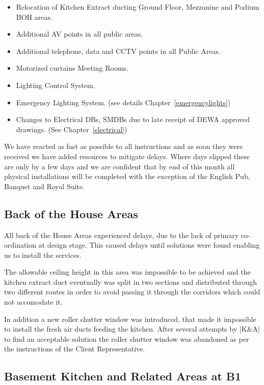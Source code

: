 \begin{itemize}
\item Relocation of Kitchen Extract ducting Ground Floor, Mezzanine and Podium BOH areas.
\item  Additional AV points in all public areas.
\item  Additional telephone, data and CCTV points in all Public Areas.
\item  Motorized curtains Meeting Rooms.
\item Lighting Control System. 
\item Emergency Lighting System. (see details Chapter~\ref{emergencylights})
\item Changes to Electrical DBs, SMDBs due to late receipt of DEWA approved drawings. (See Chapter~\ref{electrical})
\end{itemize}

We have reacted as fast as possible to all instructions and as soon they were received we have added resources to mitigate delays. Where days slipped these are only by a few days and we are confident that by end of this month all physical installations will be completed with the exception of the English Pub, Banquet and Royal Suite. 

\subsection{Back of the House Areas}

All back of the House Areas experienced delays, due to the lack of primary co-ordination at design stage. This caused delays until solutions were found enabling us to install the services. 

The allowable ceiling height in this area was impossible to be achieved and the kitchen extract duct eventually was split in two sections and distributed through two different routes in order to avoid passing it through the corridors which could not accomodate it.

In addition a new roller shutter window was introduced, that made it impossible to install the fresh air ducts feeding the kitchen. After several attempts by |K&A| to find an acceptable solution the roller shutter  window was abandoned as per the instructions of the Client Representative. 

\subsection{Basement Kitchen and Related Areas at B1}

